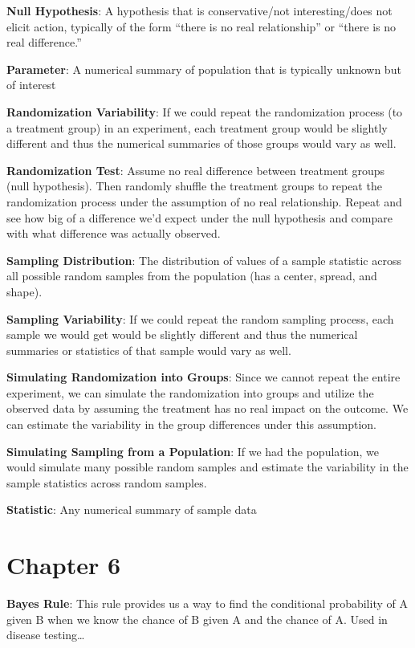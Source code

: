 \documentclass[
]{book}
\begin{document}
\textbf{Null Hypothesis}: A hypothesis that is conservative/not interesting/does not elicit action, typically of the form ``there is no real relationship'' or ``there is no real difference.''

\textbf{Parameter}: A numerical summary of population that is typically unknown but of interest

\textbf{Randomization Variability}: If we could repeat the randomization process (to a treatment group) in an experiment, each treatment group would be slightly different and thus the numerical summaries of those groups would vary as well.

\textbf{Randomization Test}: Assume no real difference between treatment groups (null hypothesis). Then randomly shuffle the treatment groups to repeat the randomization process under the assumption of no real relationship. Repeat and see how big of a difference we'd expect under the null hypothesis and compare with what difference was actually observed.

\textbf{Sampling Distribution}: The distribution of values of a sample statistic across all possible random samples from the population (has a center, spread, and shape).

\textbf{Sampling Variability}: If we could repeat the random sampling process, each sample we would get would be slightly different and thus the numerical summaries or statistics of that sample would vary as well.

\textbf{Simulating Randomization into Groups}: Since we cannot repeat the entire experiment, we can simulate the randomization into groups and utilize the observed data by assuming the treatment has no real impact on the outcome. We can estimate the variability in the group differences under this assumption.

\textbf{Simulating Sampling from a Population}: If we had the population, we would simulate many possible random samples and estimate the variability in the sample statistics across random samples.

\textbf{Statistic}: Any numerical summary of sample data

\section{Chapter 6}\label{chapter-6}

\textbf{Bayes Rule}: This rule provides us a way to find the conditional probability of A given B when we know the chance of B given A and the chance of A. Used in disease testing\ldots{}
\end{document}
